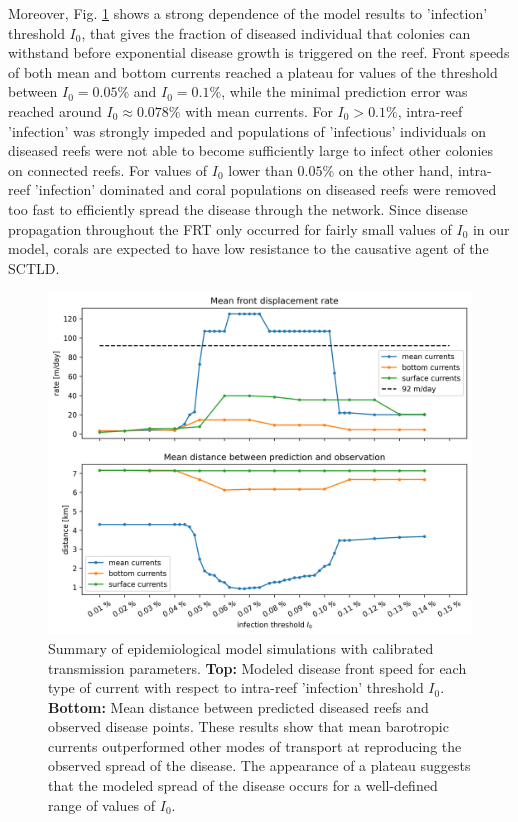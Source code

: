 Moreover, Fig. \ref{fig:results} shows a strong dependence of the model results to 'infection' threshold $I_0$, that gives the fraction of diseased individual that colonies can withstand before exponential disease growth is triggered on the reef. Front speeds of both mean and bottom currents reached a plateau for values of the threshold between $I_0=0.05\%$ and $I_0=0.1\%$, while the minimal prediction error was reached around $I_0 \approx 0.078\%$ with mean currents. For $I_0 > 0.1\%$, intra-reef 'infection' was strongly impeded and populations of 'infectious' individuals on diseased reefs were not able to become sufficiently large to infect other colonies on connected reefs. For values of $I_0$ lower than $0.05\%$ on the other hand, intra-reef 'infection' dominated and coral populations on diseased reefs were removed too fast to efficiently spread the disease through the network. Since disease propagation throughout the FRT only occurred for fairly small values of $I_0$ in our model, corals are expected to have low resistance to the causative agent of the SCTLD. 

\begin{figure}
    \centering
    \includegraphics[width=.9\textwidth]{chapters/sctld/figures/sctld_validation_corrected.jpg}
    \caption{Summary of epidemiological model simulations with calibrated transmission parameters. \textbf{Top:} Modeled disease front speed for each type of current with respect to intra-reef 'infection' threshold $I_0$. \textbf{Bottom:} Mean distance between predicted diseased reefs and observed disease points. These results show that mean barotropic currents outperformed other modes of transport at reproducing the observed spread of the disease. The appearance of a plateau suggests that the modeled spread of the disease occurs for a well-defined range of values of $I_0$.}
    \label{fig:results}
\end{figure}

